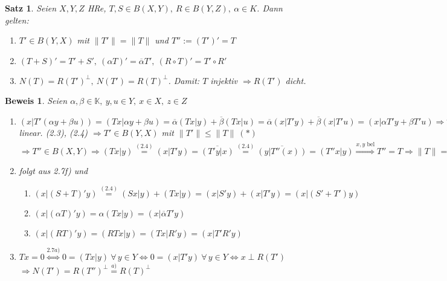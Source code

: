 \documentclass[a4paper,11pt]{book}
\newcommand{\K}{{\mathbb K}}
\newtheorem{Sa}[Def]{Satz}
\theoremstyle{nonumberplain}
\newtheorem{Bew}{Beweis}
\begin{document}
\begin{Sa}
Seien $X,Y,Z$ HRe, $T,S \in B(X,Y),\ R \in B(Y,Z),\ \alpha \in K$. Dann gelten:
\begin{enumerate}
\item[a)] $T' \in B(Y,X)$ mit $\|T'\| = \|T\|$ und $T'' := (T')' = T$

\item[b)] $(T+S)' = T' + S',\ (\alpha T)' = \overline{\alpha}T',\ (R \circ T)' = T' \circ R'$

\item[c)] $N(T) = R(T')^{\perp},\ N(T') = R(T)^{\perp}$. Damit: $T$ injektiv $\Rightarrow R(T')$ dicht.
\end{enumerate}
\end{Sa}


\begin{Bew}
Seien $\alpha,\beta \in \K,\ y,u \in Y,\ x \in X,\ z \in Z$
\begin{enumerate}
\item[a)] $(x|T'(\alpha y + \beta u)) = (Tx|\alpha y + \beta u) = \overline{\alpha}(Tx|y) + \overline{\beta}(Tx|u) = \overline{\alpha}(x|T'y) + \overline{\beta}(x|T'u) = (x| \alpha T'y + \beta T' u) \Rightarrow T'$ linear. (2.3), (2.4) $\Rightarrow T' \in B(Y,X)$ mit $\|T'\| \leq \|T\| \ (\ast)$\\
$\Rightarrow T'' \in B(X,Y) \Rightarrow (Tx|y) \stackrel{(2.4)}{=} (x|T'y) = \overline{(T'y|x)} \stackrel{(2.4)}{=} \overline{(y|T''(x))} = (T''x|y) \stackrel{x,y \text{ bel}}{\Longrightarrow} T'' = T \Rightarrow \|T\| = \|(T')'\| \stackrel{(\ast)}{\leq} \|T'\| \Longrightarrow \|T\| = \|T'\|$

\item[b)] folgt aus 2.7f) und
\begin{enumerate}
\item[i)] $(x|(S+T)'y) \stackrel{(2.4)}{=} (Sx|y) + (Tx|y) = (x|S'y) + (x|T'y) = (x|(S'+T')y)$

\item[ii)] $(x|(\alpha T)' y) = \alpha(Tx|y) = (x| \overline{\alpha}T'y)$

\item[iii)] $(x| (RT)'y) = (RTx|y) = (Tx|R'y) = (x|T'R'y)$
\end{enumerate}

\item[c)] $Tx = 0 \stackrel{2.7a)}{\Leftrightarrow} 0 = (Tx|y) \ \forall\, y \in Y \Leftrightarrow 0 = (x|T'y) \ \forall\, y \in Y \Leftrightarrow x \perp R(T')$\\
$\Rightarrow N(T') = R(T'')^{\perp} \stackrel{a)}{=} R(T)^{\perp}$
\end{enumerate}
\end{Bew}
\end{document}
